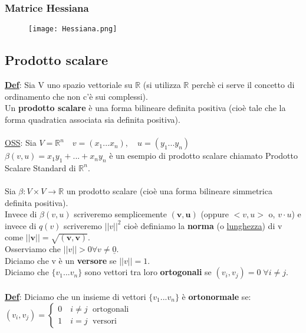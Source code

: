 \documentclass[12pt]{article}
\begin{document}
\subsubsection{Matrice Hessiana}
   
\begin{figure}[!h]
    \centering
    \texttt{[image: Hessiana.png]}
    \caption{}
    \label{hessiana}
\end{figure}

\subsection{Prodotto scalare}
\textbf{\underline{Def}}: Sia V uno spazio vettoriale su $\mathbb{R}$ (si utilizza $\mathbb{R}$ perchè ci serve il concetto di ordinamento che non c'è sui complessi).\\
Un \textbf{prodotto scalare} è una forma bilineare definita positiva (cioè tale che la forma quadratica associata sia definita positiva).\\\\
\underline{OSS}: Sia $V = \mathbb{R}^n\quad v = (x_1...x_n),\quad u = (y_1...y_n)$\\
$\beta(v,u) = x_1y_1+...+x_ny_n$ è un esempio di prodotto scalare chiamato Prodotto Scalare Standard di $\mathbb{R}^n$.\\\\ Sia $\beta: V\times V \longrightarrow \mathbb{R}$ un prodotto scalare (cioè una forma bilineare simmetrica definita positiva).\\
Invece di $\beta(v,u)$ scriveremo semplicemente $\boldsymbol{(v,u)}$ (oppure $<v,u>$ o, $v\cdot u$) e invece di $q(v)$ scriveremo $||v||^2$ cioè definiamo la \textbf{norma} (o \underline{lunghezza}) di v come $\boldsymbol{||v|| = \sqrt{(v,v)}}$.\\
Osserviamo che $||v||>0 \forall v \neq \underline{0}$.\\
Diciamo che v è un \textbf{versore} se $||v|| = 1$.\\
Diciamo che $\{v_1...v_n\}$ sono vettori tra loro \textbf{ortogonali} se $(v_i,v_j) = 0 \;\forall i\neq j$.\\\\
\textbf{\underline{Def}}: Diciamo che un insieme di vettori $\{v_1...v_n\}$ è \textbf{ortonormale} se:\\
$(v_i,v_j) = \begin{cases}
    0 \quad i\neq j \;\text{ ortogonali}\\
    1 \quad i = j \;\text{ versori}
\end{cases}$
\end{document}
